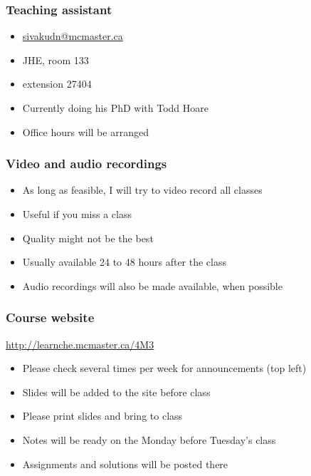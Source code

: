 \begin{frame}\frametitle{Teaching assistant}
	{\color{myGreen}{Daryl Sivakumaran}}
	\begin{itemize}
		\item	\url{sivakudn@mcmaster.ca}
		\item	JHE, room 133
		\item	extension 27404
		\item	Currently doing his PhD with Todd Hoare
		\item	Office hours will be arranged
	\end{itemize}
\end{frame}

\begin{frame}\frametitle{Video and audio recordings}
	\begin{itemize}
		\item	As long as feasible, I will try to video record all classes
		\item	Useful if you miss a class
		\item	Quality might not be the best
		\item	Usually available 24 to 48 hours after the class
		\item	Audio recordings will also be made available, when possible
	\end{itemize}
\end{frame}

\begin{frame}\frametitle{Course website}
	
	\begin{exampleblock}{}
		\centering 
		\href{http://learnche.mcmaster.ca/4M3}{http://learnche.mcmaster.ca/4M3}
	\end{exampleblock}
	\begin{itemize}
		\item	Please check several times per week for announcements {\tiny (top left)}
		\item	Slides will be added to the site before class
		\item	Please print slides and bring to class
		\item	Notes will be ready on the Monday before Tuesday's class
		\item	Assignments and solutions will be posted there
	\end{itemize}
\end{frame}

